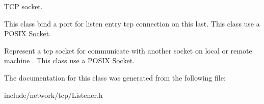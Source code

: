 T\-C\-P socket.

This class bind a port for listen entry tcp connection on this last. This class use a P\-O\-S\-I\-X \hyperlink{class_f_t_p_1_1_t_c_p_1_1_socket}{Socket}.

Represent a tcp socket for communicate with another socket on local or remote machine . This class use a P\-O\-S\-I\-X \hyperlink{class_f_t_p_1_1_t_c_p_1_1_socket}{Socket}. 

The documentation for this class was generated from the following file\-:\begin{DoxyCompactItemize}
\item 
include/network/tcp/Listener.\-h\end{DoxyCompactItemize}
